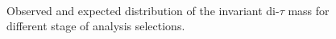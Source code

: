 \begin{figure}[p]
     \begin{center}
     
     \\	

     
    \end{center}
     	

    \caption{\footnotesize Observed and expected distribution of the 
	invariant di-$\tau$ mass \mmc for different stage of analysis selections.}
   \label{fig:mass}
\end{figure}

